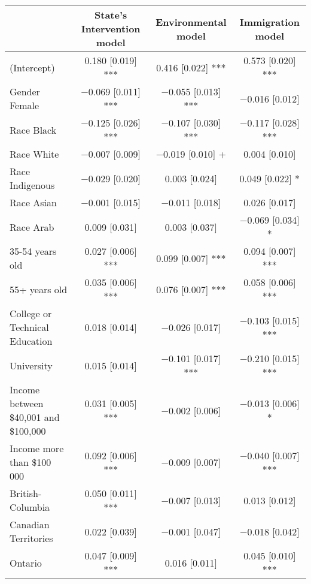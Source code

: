 \begin{table}
\centering
\begin{tabular}[t]{lccc}
\toprule
  & State's Intervention model & Environmental model & Immigration model\\
\midrule
(Intercept) & \num{0.180} [\num{0.019}] *** & \num{0.416} [\num{0.022}] *** & \num{0.573} [\num{0.020}] ***\\
Gender Female & \num{-0.069} [\num{0.011}] *** & \num{-0.055} [\num{0.013}] *** & \num{-0.016} [\num{0.012}]\\
Race Black & \num{-0.125} [\num{0.026}] *** & \num{-0.107} [\num{0.030}] *** & \num{-0.117} [\num{0.028}] ***\\
Race White & \num{-0.007} [\num{0.009}] & \num{-0.019} [\num{0.010}] + & \num{0.004} [\num{0.010}]\\
Race Indigenous & \num{-0.029} [\num{0.020}] & \num{0.003} [\num{0.024}] & \num{0.049} [\num{0.022}] *\\
Race Asian & \num{-0.001} [\num{0.015}] & \num{-0.011} [\num{0.018}] & \num{0.026} [\num{0.017}]\\
Race Arab & \num{0.009} [\num{0.031}] & \num{0.003} [\num{0.037}] & \num{-0.069} [\num{0.034}] *\\
35-54 years old & \num{0.027} [\num{0.006}] *** & \num{0.099} [\num{0.007}] *** & \num{0.094} [\num{0.007}] ***\\
55+ years old & \num{0.035} [\num{0.006}] *** & \num{0.076} [\num{0.007}] *** & \num{0.058} [\num{0.006}] ***\\
College or Technical Education & \num{0.018} [\num{0.014}] & \num{-0.026} [\num{0.017}] & \num{-0.103} [\num{0.015}] ***\\
University & \num{0.015} [\num{0.014}] & \num{-0.101} [\num{0.017}] *** & \num{-0.210} [\num{0.015}] ***\\
Income between \$40,001 and \$100,000 & \num{0.031} [\num{0.005}] *** & \num{-0.002} [\num{0.006}] & \num{-0.013} [\num{0.006}] *\\
Income more than \$100 000 & \num{0.092} [\num{0.006}] *** & \num{-0.009} [\num{0.007}] & \num{-0.040} [\num{0.007}] ***\\
British-Columbia & \num{0.050} [\num{0.011}] *** & \num{-0.007} [\num{0.013}] & \num{0.013} [\num{0.012}]\\
Canadian Territories & \num{0.022} [\num{0.039}] & \num{-0.001} [\num{0.047}] & \num{-0.018} [\num{0.042}]\\
Ontario & \num{0.047} [\num{0.009}] *** & \num{0.016} [\num{0.011}] & \num{0.045} [\num{0.010}] ***\\

\end{tabular}
\end{table}
